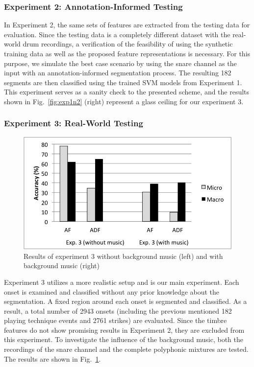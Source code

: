 \documentclass{article}
\begin{document}
\subsubsection{Experiment 2: Annotation-Informed Testing}\label{sssec:exp2}
In Experiment 2, the same sets of features are extracted from the testing data for evaluation. Since the testing data is a completely different dataset with the real-world drum recordings, a verification of the feasibility of using the synthetic training data as well as the proposed feature representations is necessary. For this purpose, we simulate the best case scenario by using the snare channel as the input with an annotation-informed segmentation process. The resulting 182 segments are then classified using the trained SVM models from Experiment 1. This experiment serves as a sanity check to the presented scheme, and the results shown in Fig.~\ref{fig:exp1n2} (right) represent a glass ceiling for our experiment 3.

\subsubsection{Experiment 3: Real-World Testing}\label{sssec:exp3}
\begin{figure}
\centering
\includegraphics[width = 8.0 cm]{./figures/exp3.png}
\caption{Results of experiment 3 without background music (left) and with background music (right)}
\label{fig:exp3}
\end{figure}
Experiment 3 utilizes a more realistic setup and is our main experiment. Each onset is examined and classified without any prior knowledge about the segmentation. A fixed region around each onset is segmented and classified. As a result, a total number of 2943 onsets (including the previous mentioned 182 playing technique events and 2761 strikes) are evaluated. Since the timbre features do not show promising results in Experiment 2, they are excluded from this experiment. {\color{red}{maybe reconsider: it might be nice and consistent to have them in all results}} To investigate the influence of the background music, both the recordings of the snare channel and the complete polyphonic mixtures are tested. The results are shown in Fig.~\ref{fig:exp3}. {\color{red}{describe the results and give numbers}} 
\end{document}
